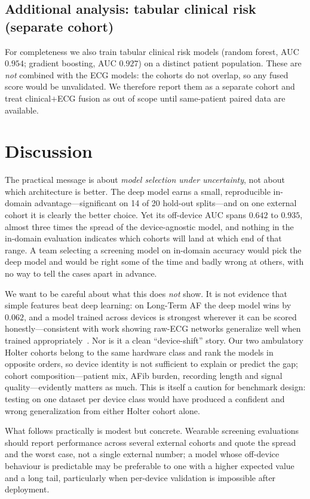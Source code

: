 \documentclass[]{ws-procs9x6}
\begin{document}
\subsection{Additional analysis: tabular clinical risk (separate cohort)}
\label{sec:extra}
For completeness we also train tabular clinical risk models (random forest, AUC
$0.954$; gradient boosting, AUC $0.927$) on a distinct patient population. These
are \emph{not} combined with the ECG models: the cohorts do not overlap, so any
fused score would be unvalidated. We therefore report them as a separate cohort
and treat clinical$+$ECG fusion as out of scope until same-patient paired data are
available.

\section{Discussion}
The practical message is about \emph{model selection under uncertainty}, not about
which architecture is better. The deep model earns a small, reproducible in-domain
advantage---significant on 14 of 20 hold-out splits---and on one external cohort
it is clearly the better choice. Yet its off-device AUC spans $0.642$ to $0.935$,
almost three times the spread of the device-agnostic model, and nothing in the
in-domain evaluation indicates which cohorts will land at which end of that range.
A team selecting a screening model on in-domain accuracy would pick the deep
model and would be right some of the time and badly wrong at others, with no way
to tell the cases apart in advance.

We want to be careful about what this does \emph{not} show. It is not evidence
that simple features beat deep learning: on Long-Term AF the deep model wins by
$0.062$, and a model trained across devices is strongest wherever it can be scored
honestly---consistent with work showing raw-ECG networks generalize well when
trained appropriately~\cite{benmoshe2024rawecgnet}. Nor is it a clean
``device-shift'' story. Our two ambulatory Holter cohorts belong to the same
hardware class and rank the models in opposite orders, so device identity is not
sufficient to explain or predict the gap; cohort composition---patient mix, AFib
burden, recording length and signal quality---evidently matters as much. This is
itself a caution for benchmark design: testing on one dataset per device class
would have produced a confident and wrong generalization from either Holter cohort
alone.

What follows practically is modest but concrete. Wearable screening evaluations
should report performance across several external cohorts and quote the spread and
the worst case, not a single external number; a model whose off-device behaviour is
predictable may be preferable to one with a higher expected value and a long tail,
particularly when per-device validation is impossible after deployment.
\end{document}
